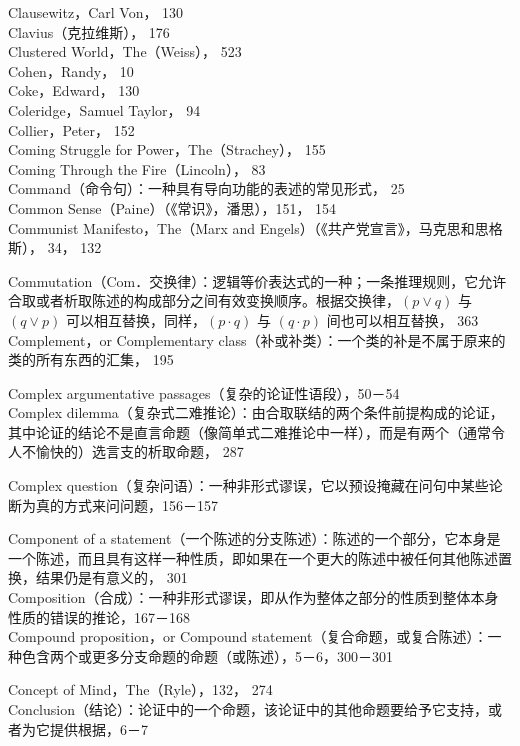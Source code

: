 Clausewitz，Carl Von， 130\\
Clavius（克拉维斯）， 176\\
Clustered World，The（Weiss）， 523\\
Cohen，Randy， 10\\
Coke，Edward， 130\\
Coleridge，Samuel Taylor， 94\\
Collier，Peter， 152\\
Coming Struggle for Power，The（Strachey）， 155\\
Coming Through the Fire（Lincoln）， 83\\
Command（命令句）：一种具有导向功能的表述的常见形式， 25\\
Common Sense（Paine）（《常识》，潘思），151， 154\\
Communist Manifesto，The（Marx and Engels）（《共产党宣言》，马克思和思格斯）， 34， 132

Commutation（Com．交换律）：逻辑等价表达式的一种；一条推理规则，它允许合取或者析取陈述的构成部分之间有效变换顺序。根据交换律，$(p \vee q)$ 与 $(q \vee p)$ 可以相互替换，同样，$(p \cdot q)$ 与 $(q \cdot p)$ 间也可以相互替换， 363\\
Complement，or Complementary class（补或补类）：一个类的补是不属于原来的类的所有东西的汇集， 195

Complex argumentative passages（复杂的论证性语段），50－54\\
Complex dilemma（复杂式二难推论）：由合取联结的两个条件前提构成的论证，其中论证的结论不是直言命题（像简单式二难推论中一样），而是有两个（通常令人不愉快的）选言支的析取命题， 287

Complex question（复杂问语）：一种非形式谬误，它以预设掩藏在问句中某些论断为真的方式来问问题，156－157

Component of a statement（一个陈述的分支陈述）：陈述的一个部分，它本身是一个陈述，而且具有这样一种性质，即如果在一个更大的陈述中被任何其他陈述置换，结果仍是有意义的， 301\\
Composition（合成）：一种非形式谬误，即从作为整体之部分的性质到整体本身性质的错误的推论，167－168\\
Compound proposition，or Compound statement（复合命题，或复合陈述）：一种色含两个或更多分支命题的命题（或陈述），5－6，300－301

Concept of Mind，The（Ryle），132， 274\\
Conclusion（结论）：论证中的一个命题，该论证中的其他命题要给予它支持，或者为它提供根据，6－7

